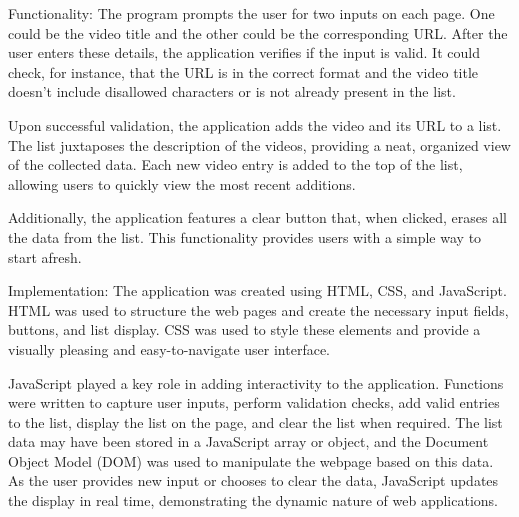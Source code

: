 \documentclass[a4paper, 11pt]{report}
\begin{document}
Functionality:
The program prompts the user for two inputs on each page. One could be the video title and the other could be the corresponding URL. After the user enters these details, the application verifies if the input is valid. It could check, for instance, that the URL is in the correct format and the video title doesn't include disallowed characters or is not already present in the list.

Upon successful validation, the application adds the video and its URL to a list. The list juxtaposes the description of the videos, providing a neat, organized view of the collected data. Each new video entry is added to the top of the list, allowing users to quickly view the most recent additions.

Additionally, the application features a clear button that, when clicked, erases all the data from the list. This functionality provides users with a simple way to start afresh.

Implementation:
The application was created using HTML, CSS, and JavaScript. HTML was used to structure the web pages and create the necessary input fields, buttons, and list display. CSS was used to style these elements and provide a visually pleasing and easy-to-navigate user interface.

JavaScript played a key role in adding interactivity to the application. Functions were written to capture user inputs, perform validation checks, add valid entries to the list, display the list on the page, and clear the list when required. The list data may have been stored in a JavaScript array or object, and the Document Object Model (DOM) was used to manipulate the webpage based on this data. As the user provides new input or chooses to clear the data, JavaScript updates the display in real time, demonstrating the dynamic nature of web applications.
\end{document}
